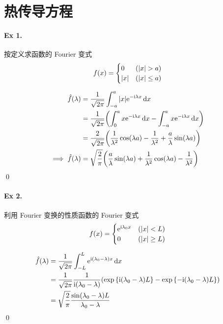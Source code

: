 \section{热传导方程}
\paragraph{Ex 1.}
按定义求函数的 Fourier 变式
\[
f(x) = \begin{cases}0 & ({\lvert {x} \rvert} > a) \\ {\lvert {x} \rvert} & ({\lvert {x} \rvert} \leq a) \end{cases}
\]

\begin{solution}
\[ \begin{aligned}
\hat f(\lambda) &= \frac{1}{\sqrt{2\pi}} \int_{-a}^a
 {\lvert {x} \rvert} {\mathrm e}^{-{\mathrm i} \lambda x} \operatorname{d\!} x \\
&= \frac{1}{\sqrt{2\pi}} {\left( {
    \int_0^a x {\mathrm e}^{-{\mathrm i} \lambda x} \operatorname{d\!} x
    -\int_{-a}^a x {\mathrm e}^{-{\mathrm i} \lambda x} \operatorname{d\!} x
} \right)} \\
&= \frac{2}{\sqrt{2\pi}} {\left( {
    \frac{1}{\lambda^2} \cos (\lambda a) - \frac{1}{\lambda^2}
    +\frac{a}{\lambda} \sin (\lambda a)
} \right)} \\
\implies \hat f(\lambda) &= \sqrt{\frac{2}{\pi}} {\left( {
    \frac{a}{\lambda} \sin (\lambda a) + \frac{1}{\lambda^2} \cos (\lambda a)
    - \frac{1}{\lambda^2}
} \right)}
\end{aligned} \]
\qed
\end{solution}


\paragraph{Ex 2.}
利用 Fourier 变换的性质函数的 Fourier 变式
\[
f(x)=\begin{cases}{\mathrm e}^{{\mathrm i} \lambda_0 x}&({\lvert {x} \rvert}< L)\\0&({\lvert {x} \rvert}\geq L)\end{cases}
\]

\begin{solution}
\[ \begin{aligned}
\hat f(\lambda) &= \frac{1}{\sqrt{2\pi}} \int_{-L}^L
 {\mathrm e}^{{\mathrm i} (\lambda_0 - \lambda) x} \operatorname{d\!} x \\
&= \frac{1}{\sqrt{2\pi}} \frac{1}{{\mathrm i} (\lambda_0 - \lambda)}  {\left( {
    \exp {\left\{ {{\mathrm i}(\lambda_0 - \lambda) L} \right\}}
    -\exp {\left\{ {-{\mathrm i}(\lambda_0 - \lambda) L} \right\}}
} \right)} \\
&= \sqrt{\frac{2}{\pi}} \frac{\sin(\lambda_0 - \lambda) L}{\lambda_0 - \lambda}
\end{aligned} \]
\qed
\end{solution}


